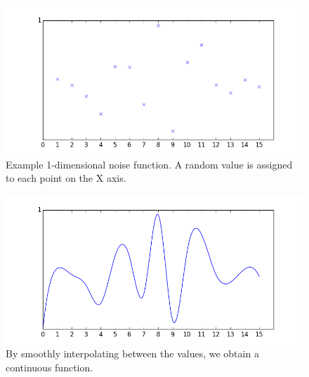 \documentclass[12pt,a4paper]{article}
\begin{document}
\begin{figure}[h]
  \centering
 	\includegraphics[scale=0.5]{images/figure2.png}
	\caption[]{Example 1-dimensional noise function. A random value is assigned to each point on the X axis.}
	\label{fig:fig4}
\end{figure}

\begin{figure}[h]
  \centering
 	\includegraphics[scale=0.5]{images/figure1.png}
	\caption[]{By smoothly interpolating between the values, we obtain a continuous function.}
	\label{fig:fig5}
\end{figure}






\end{document}
